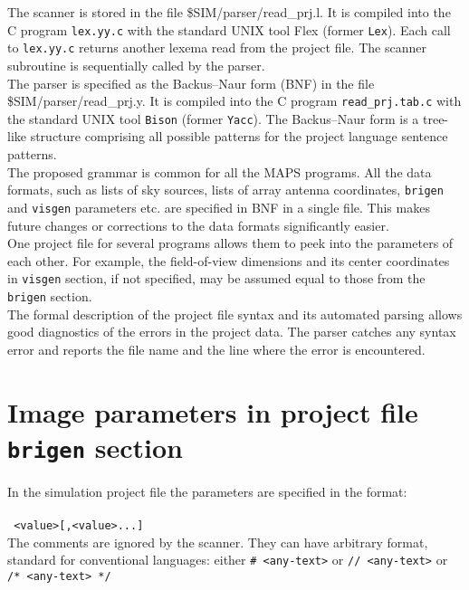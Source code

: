 \documentclass[letterpaper, oneside, 11pt]{article}
\begin{document}
The scanner is stored in the file \$SIM/parser/read\_prj.l. It is compiled into the C program {\tt lex.yy.c} with the standard UNIX tool Flex (former {\tt Lex}). Each call to {\tt lex.yy.c} returns another lexema read from the project file. The scanner subroutine is sequentially called by the parser.\\

The parser is specified as the Backus–Naur form (BNF) in the file\\ \$SIM/parser/read\_prj.y. It is compiled into the C program {\tt read\_prj.tab.c} with the standard UNIX tool {\tt Bison} (former {\tt Yacc}). The Backus–Naur form is a tree-like structure comprising all possible patterns for the project language sentence patterns. \\

The proposed grammar is common for all the MAPS programs. All the data formats, such as lists of sky sources, lists of array antenna coordinates, {\tt brigen} and {\tt visgen} parameters etc. are specified in BNF in a single file. This makes future changes or corrections to the data formats significantly easier. \\

One project file for several programs allows them to peek into the parameters of each other. For example, the field-of-view dimensions and its center coordinates in {\tt visgen} section, if not specified, may be assumed equal to those from the {\tt brigen} section. \\

The formal description of the project file syntax and its automated parsing allows good diagnostics of the errors in the project data. The parser catches any syntax error and reports the file name and the line where the error is encountered.

\section{Image parameters in project file {\tt brigen} section} 
In the simulation project file the parameters are specified in the format: \\\\
{\tt <parameter-name> \quad <value>[,<value>...] \quad [<comment>]}\\

The comments are ignored by the scanner. They can have arbitrary format, standard for conventional languages: either {\tt \# <any-text>} or {\tt // <any-text>} or  {\tt /* <any-text> */} 
\end{document}
